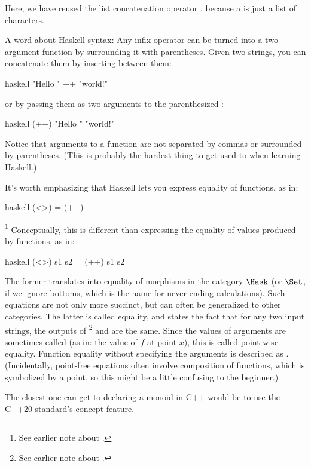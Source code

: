 Here, we have reused the list concatenation operator \code{(++)},
because a  is just a list of characters.

A word about Haskell syntax: Any infix operator can be turned into a
two-argument function by surrounding it with parentheses. Given two
strings, you can concatenate them by inserting \code{++} between them:

\begin{snip}{haskell}
"Hello " ++ "world!"
\end{snip}
or by passing them as two arguments to the parenthesized \code{(++)}:

\begin{snip}{haskell}
(++) "Hello " "world!"
\end{snip}
Notice that arguments to a function are not separated by commas or
surrounded by parentheses. (This is probably the hardest thing to get
used to when learning Haskell.)

It's worth emphasizing that Haskell lets you express equality of
functions, as in:

\begin{snip}{haskell}
(<>) = (++)
\end{snip}
\footnote{See earlier note about .} 
Conceptually, this is different than expressing the equality of values
produced by functions, as in:

\begin{snip}{haskell}
(<>) s1 s2 = (++) s1 s2
\end{snip}
The former translates into equality of morphisms in the category
$\Hask$ (or $\Set$, if we ignore bottoms, which is the name
for never-ending calculations). Such equations are not only more
succinct, but can often be generalized to other categories. The latter
is called  equality, and states the fact that for any
two input strings, the outputs of \code{(<>)}\footnote{See earlier note about .} and \code{(++)} are
the same. Since the values of arguments are sometimes called
 (as in: the value of $f$ at point $x$), this is called
point-wise equality. Function equality without specifying the arguments
is described as . (Incidentally, point-free equations
often involve composition of functions, which is symbolized by a point,
so this might be a little confusing to the beginner.)

The closest one can get to declaring a monoid in C++ would be to use the
C++20 standard's concept feature.

